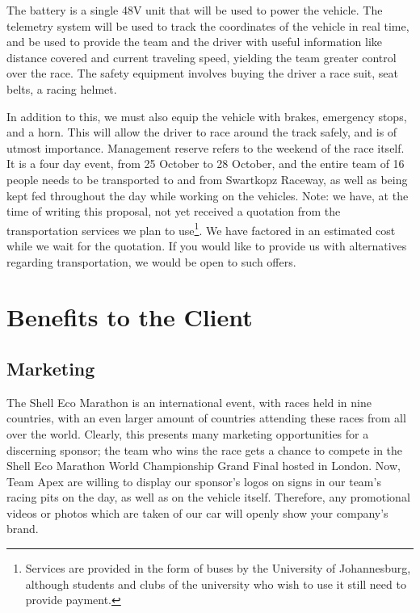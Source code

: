 \documentclass[a4paper, 12pt]{article}
\begin{document}
		The battery is a single 48V unit that will be used to power the vehicle. The telemetry system will be used to track the coordinates of the vehicle in real time, and be used to provide the team and the driver with useful information like distance covered and current traveling speed, yielding the team greater control over the race. The safety equipment involves buying the driver a race suit, seat belts, a racing helmet.

		In addition to this, we must also equip the vehicle with brakes, emergency stops, and a horn. This will allow the driver to race around the track safely, and is of utmost importance. Management reserve refers to the weekend of the race itself. It is a four day event, from 25 October to 28 October, and the entire team of 16 people needs to be transported to and from Swartkopz Raceway, as well as being kept fed throughout the day while working on the vehicles. Note: we have, at the time of writing this proposal, not yet received a quotation from the transportation services we plan to use\footnote{Services are provided in the form of buses by the University of Johannesburg, although students and clubs of the university who wish to use it still need to provide payment.}. We have factored in an estimated cost while we wait for the quotation. If you would like to provide us with alternatives regarding transportation, we would be open to such offers.

	\section{Benefits to the Client} %
	\label{sec:benefits_to_the_client}
		\subsection{Marketing} %
		\label{sub:marketing}
			The Shell Eco Marathon is an international event, with races held in nine countries, with an even larger amount of countries attending these races from all over the world. Clearly, this presents many marketing opportunities for a discerning sponsor; the team who wins the race gets a chance to compete in the Shell Eco Marathon World Championship Grand Final hosted in London. Now, Team Apex are willing to display our sponsor's logos on signs in our team's racing pits on the day, as well as on the vehicle itself. Therefore, any promotional videos or photos which are taken of our car will openly show your company's brand.
		
\end{document}
